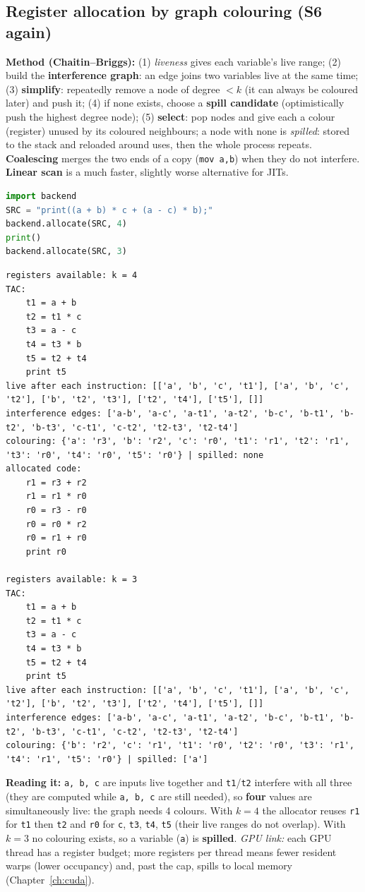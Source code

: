 \documentclass[10pt,a4paper,openany,oneside]{report}
\begin{document}
\subsection{Register allocation by graph colouring (S6 again)}
\textbf{Method (Chaitin--Briggs):} (1) \emph{liveness} gives each variable's live range; (2) build the \textbf{interference graph}: an edge joins two variables live at the same time; (3) \textbf{simplify}: repeatedly remove a node of degree $<k$ (it can always be coloured later) and push it; (4) if none exists, choose a \textbf{spill candidate} (optimistically push the highest degree node); (5) \textbf{select}: pop nodes and give each a colour (register) unused by its coloured neighbours; a node with none is \emph{spilled}: stored to the stack and reloaded around uses, then the whole process repeats. \textbf{Coalescing} merges the two ends of a copy (\texttt{mov a,b}) when they do not interfere. \textbf{Linear scan} is a much faster, slightly worse alternative for JITs.
\begin{lstlisting}[language={Python},title={Interference graph and colouring for print((a+b)*c + (a-c)*b) with 4 registers, then 3}]
import backend
SRC = "print((a + b) * c + (a - c) * b);"
backend.allocate(SRC, 4)
print()
backend.allocate(SRC, 3)
\end{lstlisting}
\begin{lstlisting}[style=out,title={Captured output}]
registers available: k = 4
TAC:
    t1 = a + b
    t2 = t1 * c
    t3 = a - c
    t4 = t3 * b
    t5 = t2 + t4
    print t5
live after each instruction: [['a', 'b', 'c', 't1'], ['a', 'b', 'c', 't2'], ['b', 't2', 't3'], ['t2', 't4'], ['t5'], []]
interference edges: ['a-b', 'a-c', 'a-t1', 'a-t2', 'b-c', 'b-t1', 'b-t2', 'b-t3', 'c-t1', 'c-t2', 't2-t3', 't2-t4']
colouring: {'a': 'r3', 'b': 'r2', 'c': 'r0', 't1': 'r1', 't2': 'r1', 't3': 'r0', 't4': 'r0', 't5': 'r0'} | spilled: none
allocated code:
    r1 = r3 + r2
    r1 = r1 * r0
    r0 = r3 - r0
    r0 = r0 * r2
    r0 = r1 + r0
    print r0

registers available: k = 3
TAC:
    t1 = a + b
    t2 = t1 * c
    t3 = a - c
    t4 = t3 * b
    t5 = t2 + t4
    print t5
live after each instruction: [['a', 'b', 'c', 't1'], ['a', 'b', 'c', 't2'], ['b', 't2', 't3'], ['t2', 't4'], ['t5'], []]
interference edges: ['a-b', 'a-c', 'a-t1', 'a-t2', 'b-c', 'b-t1', 'b-t2', 'b-t3', 'c-t1', 'c-t2', 't2-t3', 't2-t4']
colouring: {'b': 'r2', 'c': 'r1', 't1': 'r0', 't2': 'r0', 't3': 'r1', 't4': 'r1', 't5': 'r0'} | spilled: ['a']
\end{lstlisting}
\textbf{Reading it:} \texttt{a, b, c} are inputs live together and \texttt{t1}/\texttt{t2} interfere with all three (they are computed while \texttt{a, b, c} are still needed), so \textbf{four} values are simultaneously live: the graph needs 4 colours. With $k=4$ the allocator reuses \texttt{r1} for \texttt{t1} then \texttt{t2} and \texttt{r0} for \texttt{c}, \texttt{t3}, \texttt{t4}, \texttt{t5} (their live ranges do not overlap). With $k=3$ no colouring exists, so a variable (\texttt{a}) is \textbf{spilled}. \emph{GPU link:} each GPU thread has a register budget; more registers per thread means fewer resident warps (lower occupancy) and, past the cap, spills to local memory (Chapter~\ref{ch:cuda}).
\end{document}

